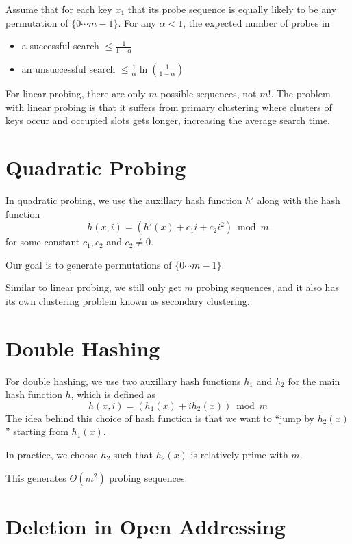 \vspace{\parskip}

\begin{theorem}
    Assume that for each key $x_1$ that its probe sequence is equally likely to be any permutation of $\{0\cdots m-1\}$. For any $\alpha<1$, the expected number of probes in
    \begin{itemize}
        \item a successful search $\leq \frac{1}{1-\alpha}$
        \item an unsuccessful search $\leq \frac{1}{\alpha} \ln\left( \frac{1}{1-\alpha} \right) $  
    \end{itemize}
\end{theorem}

For linear probing, there are only $m$ possible sequences, not $m!$. The problem with linear probing is that it suffers from primary clustering where clusters of keys occur and occupied slots gets longer, increasing the average search time.

\section{Quadratic Probing}

In quadratic probing, we use the auxillary hash function $h'$ along with the hash function
$$
h(x,i) = (h'(x) + c_1i + c_2i^2) \bmod m
$$
for some constant $c_1,c_2$ and $c_2 \neq 0$.

Our goal is to generate permutations of $\{0\cdots m-1\}$. 

Similar to linear probing, we still only get $m$ probing sequences, and it also has its own clustering problem known as secondary clustering.

\section{Double Hashing}

For double hashing, we use two auxillary hash functions $h_1$ and $h_2$ for the main hash function $h$, which is defined as
$$
h(x,i) = (h_1(x) + ih_2(x)) \bmod m
$$
The idea behind this choice of hash function is that we want to ``jump by $h_2(x)$'' starting from $h_1(x)$.

In practice, we choose $h_2$ such that $h_2(x)$ is relatively prime with $m$.

This generates $\Theta(m^2)$ probing sequences.

\section{Deletion in Open Addressing}

